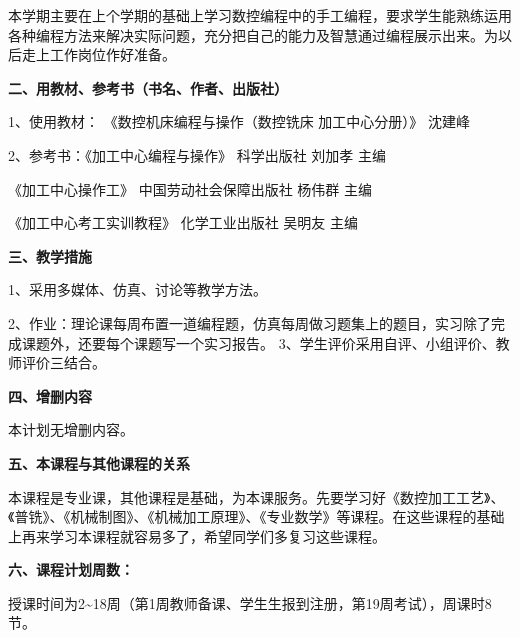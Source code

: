 \documentclass[12pt]{article}
\begin{document}
本学期主要在上个学期的基础上学习数控编程中的手工编程，要求学生能熟练运用各种编程方法来解决实际问题，充分把自己的能力及智慧通过编程展示出来。为以后走上工作岗位作好准备。

\textbf{二、用教材、参考书（书名、作者、出版社）}

1、使用教材： 《数控机床编程与操作（数控铣床 加工中心分册）》 沈建峰

2、参考书：《加工中心编程与操作》  科学出版社  刘加孝   主编

\hspace{4.5em}《加工中心操作工》 中国劳动社会保障出版社  杨伟群  主编

\hspace{4.5em}《加工中心考工实训教程》  化学工业出版社   吴明友 主编

\textbf{三、教学措施}

1、采用多媒体、仿真、讨论等教学方法。

2、作业：理论课每周布置一道编程题，仿真每周做习题集上的题目，实习除了完成课题外，还要每个课题写一个实习报告。
3、学生评价采用自评、小组评价、教师评价三结合。

\textbf{四、增删内容}

本计划无增删内容。

\textbf{五、本课程与其他课程的关系}

本课程是专业课，其他课程是基础，为本课服务。先要学习好《数控加工工艺》、《普铣》、《机械制图》、《机械加工原理》、《专业数学》等课程。在这些课程的基础上再来学习本课程就容易多了，希望同学们多复习这些课程。

\textbf{六、课程计划周数：}

授课时间为2\~{}18周（第1周教师备课、学生生报到注册，第19周考试），周课时8节。
\end{document}
